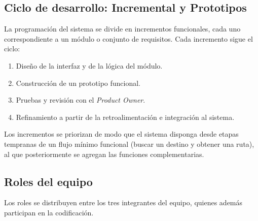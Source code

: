 \subsection{Ciclo de desarrollo: Incremental y Prototipos}

La programación del sistema se divide en incrementos funcionales, cada uno correspondiente a un módulo o conjunto de requisitos. Cada incremento sigue el ciclo:

\begin{enumerate}
    \item Diseño de la interfaz y de la lógica del módulo.
    \item Construcción de un prototipo funcional.
    \item Pruebas y revisión con el \textit{Product Owner}.
    \item Refinamiento a partir de la retroalimentación e integración al sistema.
\end{enumerate}

Los incrementos se priorizan de modo que el sistema disponga desde etapas tempranas de un flujo mínimo funcional (buscar un destino y obtener una ruta), al que posteriormente se agregan las funciones complementarias.

\subsection{Roles del equipo}
\label{Roles_equip}

Los roles se distribuyen entre los tres integrantes del equipo, quienes además participan en la codificación.

